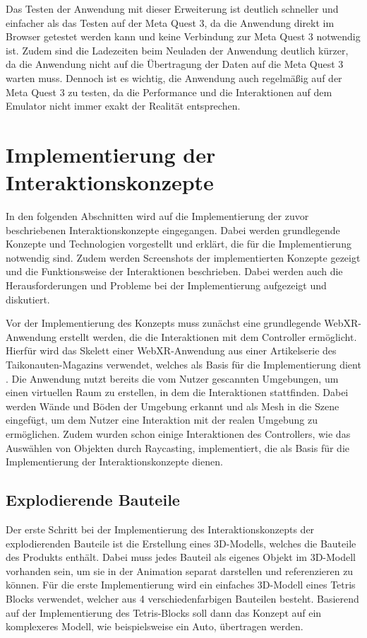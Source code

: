 Das Testen der Anwendung mit dieser Erweiterung ist deutlich schneller und einfacher als das Testen auf der Meta Quest 3, da die Anwendung direkt im Browser getestet werden kann und keine Verbindung zur Meta Quest 3 notwendig ist.
Zudem sind die Ladezeiten beim Neuladen der Anwendung deutlich kürzer, da die Anwendung nicht auf die Übertragung der Daten auf die Meta Quest 3 warten muss.
Dennoch ist es wichtig, die Anwendung auch regelmäßig auf der Meta Quest 3 zu testen, da die Performance und die Interaktionen auf dem Emulator nicht immer exakt der Realität entsprechen.


\section{Implementierung der Interaktionskonzepte}

In den folgenden Abschnitten wird auf die Implementierung der zuvor beschriebenen Interaktionskonzepte eingegangen.
Dabei werden grundlegende Konzepte und Technologien vorgestellt und erklärt, die für die Implementierung notwendig sind.
Zudem werden Screenshots der implementierten Konzepte gezeigt und die Funktionsweise der Interaktionen beschrieben.
Dabei werden auch die Herausforderungen und Probleme bei der Implementierung aufgezeigt und diskutiert.

Vor der Implementierung des Konzepts muss zunächst eine grundlegende WebXR-Anwendung erstellt werden, die die Interaktionen mit dem Controller ermöglicht.
Hierfür wird das Skelett einer WebXR-Anwendung aus einer Artikelserie des Taikonauten-Magazins verwendet, welches als Basis für die Implementierung dient \autocite[][]{taikonauten-magazine}.
Die Anwendung nutzt bereits die vom Nutzer gescannten Umgebungen, um einen virtuellen Raum zu erstellen, in dem die Interaktionen stattfinden.
Dabei werden Wände und Böden der Umgebung erkannt und als Mesh in die Szene eingefügt, um dem Nutzer eine Interaktion mit der realen Umgebung zu ermöglichen.
Zudem wurden schon einige Interaktionen des Controllers, wie das Auswählen von Objekten durch Raycasting, implementiert, die als Basis für die Implementierung der Interaktionskonzepte dienen.


\subsection{Explodierende Bauteile}

Der erste Schritt bei der Implementierung des Interaktionskonzepts der \glqq{}explodierenden\grqq{} Bauteile ist die Erstellung eines 3D-Modells, welches die Bauteile des Produkts enthält.
Dabei muss jedes Bauteil als eigenes Objekt im 3D-Modell vorhanden sein, um sie in der Animation separat darstellen und referenzieren zu können.
Für die erste Implementierung wird ein einfaches 3D-Modell eines Tetris Blocks verwendet, welcher aus 4 verschiedenfarbigen Bauteilen besteht.
Basierend auf der Implementierung des Tetris-Blocks soll dann das Konzept auf ein komplexeres Modell, wie beispielsweise ein Auto, übertragen werden.

